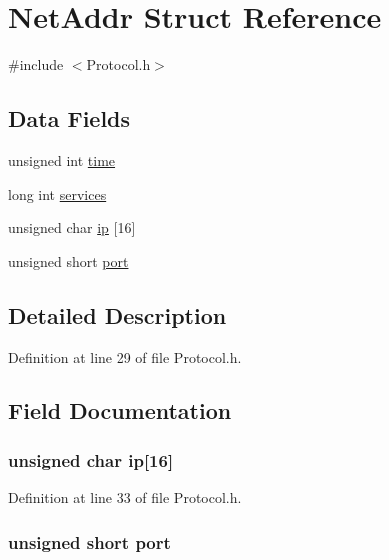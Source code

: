 \hypertarget{struct_net_addr}{
\section{NetAddr Struct Reference}
\label{struct_net_addr}
}


{\ttfamily \#include $<$Protocol.h$>$}

\subsection*{Data Fields}
\begin{DoxyCompactItemize}
\item 
unsigned int \hyperlink{struct_net_addr_a83e57ce9bd59cfa0995c2e2c8589c274}{time}
\item 
long int \hyperlink{struct_net_addr_a7c2c2697560cb0d08fdca3bd4d10d07e}{services}
\item 
unsigned char \hyperlink{struct_net_addr_a9799580e054ff5683ffbeb32502f7475}{ip} \mbox{[}16\mbox{]}
\item 
unsigned short \hyperlink{struct_net_addr_ab85ff85aa1f60f4a1c1ca1225a9dad06}{port}
\end{DoxyCompactItemize}


\subsection{Detailed Description}


Definition at line 29 of file Protocol.h.



\subsection{Field Documentation}
\hypertarget{struct_net_addr_a9799580e054ff5683ffbeb32502f7475}{
\subsubsection[{ip}]{\setlength{\rightskip}{0pt plus 5cm}unsigned char {\bf ip}\mbox{[}16\mbox{]}}}
\label{struct_net_addr_a9799580e054ff5683ffbeb32502f7475}


Definition at line 33 of file Protocol.h.

\hypertarget{struct_net_addr_ab85ff85aa1f60f4a1c1ca1225a9dad06}{
\subsubsection[{port}]{\setlength{\rightskip}{0pt plus 5cm}unsigned short {\bf port}}}
\label{struct_net_addr_ab85ff85aa1f60f4a1c1ca1225a9dad06}


